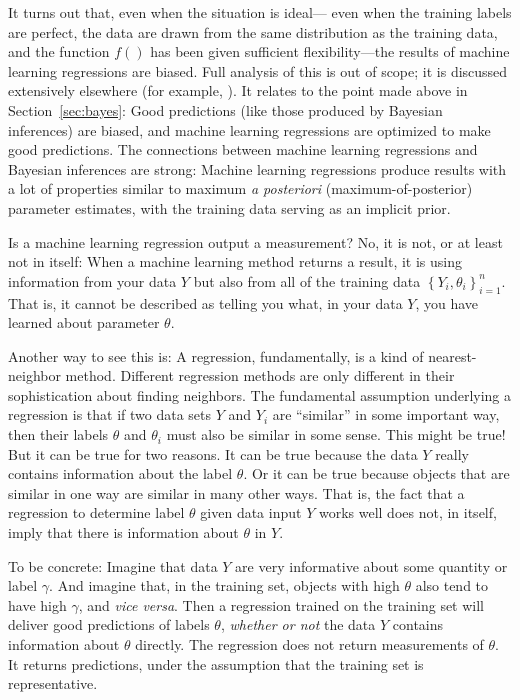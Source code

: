 \documentclass{article}
\newcommand{\sectionname}{Section}
\newcommand{\secref}[1]{\sectionname~\ref{#1}}
\newcommand{\foreign}[1]{\textsl{#1}}
\newcommand{\setof}[1]{\left\{{#1}\right\}}
\begin{document}
It turns out that, even when the situation is ideal---%
even when the training labels are perfect, the data are drawn from the same distribution as the training data, and the function $f()$ has been given sufficient flexibility---the results of machine learning regressions are biased.
Full analysis of this is out of scope; it is discussed extensively elsewhere (for example, \cite{goodorbad, ting}).
It relates to the point made above in \secref{sec:bayes}:
Good predictions (like those produced by Bayesian inferences) are biased, and machine learning regressions are optimized to make good predictions.
The connections between machine learning regressions and Bayesian inferences are strong:
Machine learning regressions produce results with a lot of properties similar to maximum \foreign{a posteriori} (maximum-of-posterior) parameter estimates, with the training data serving as an implicit prior.

Is a machine learning regression output a measurement?
No, it is not, or at least not in itself:
When a machine learning method returns a result, it is using information from your data $Y$
but also from all of the training data $\setof{Y_i, \theta_i}_{i=1}^n$.
That is, it cannot be described as telling you what, in your data $Y$, you have learned about parameter $\theta$.

Another way to see this is:
A regression, fundamentally, is a kind of nearest-neighbor method.
Different regression methods are only different in their sophistication about finding neighbors.
The fundamental assumption underlying a regression is that if two data sets $Y$ and $Y_i$ are ``similar'' in some important way, then their labels $\theta$ and $\theta_i$ must also be similar in some sense.
This might be true!
But it can be true for two reasons.
It can be true because the data $Y$ really contains information about the label $\theta$.
Or it can be true because objects that are similar in one way are similar in many other ways.
That is, the fact that a regression to determine label $\theta$ given data input $Y$ works well does not, in itself, imply that there is information about $\theta$ in $Y$.

To be concrete: Imagine that data $Y$ are very informative about some quantity or label $\gamma$.
And imagine that, in the training set, objects with high $\theta$ also tend to have high $\gamma$, and \foreign{vice versa}.
Then a regression trained on the training set will deliver good predictions of labels $\theta$, \emph{whether or not} the data $Y$ contains information about $\theta$ directly.
The regression does not return measurements of $\theta$.
It returns predictions, under the assumption that the training set is representative.
\end{document}
